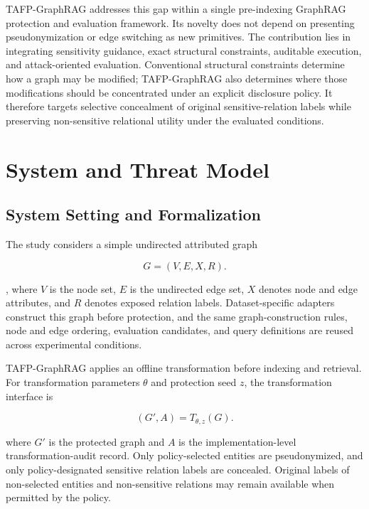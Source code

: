 \documentclass[preprint,12pt]{elsarticle}
\begin{document}
TAFP-GraphRAG addresses this gap within a single pre-indexing GraphRAG protection and evaluation framework. Its novelty does not depend on presenting pseudonymization or edge switching as new primitives. The contribution lies in integrating sensitivity guidance, exact structural constraints, auditable execution, and attack-oriented evaluation. Conventional structural constraints determine how a graph may be modified; TAFP-GraphRAG also determines where those modifications should be concentrated under an explicit disclosure policy. It therefore targets selective concealment of original sensitive-relation labels while preserving non-sensitive relational utility under the evaluated conditions.

\section{System and Threat Model}

\subsection{System Setting and Formalization}

The study considers a simple undirected attributed graph

\begin{equation}G=(V,E,X,R).\end{equation}

, where $V$ is the node set, $E$ is the undirected edge set, $X$ denotes node and edge attributes, and $R$ denotes exposed relation labels. Dataset-specific adapters construct this graph before protection, and the same graph-construction rules, node and edge ordering, evaluation candidates, and query definitions are reused across experimental conditions.

TAFP-GraphRAG applies an offline transformation before indexing and retrieval. For transformation parameters $\theta$ and protection seed $z$, the transformation interface is

\begin{equation}(G',A)=T_{\theta,z}(G).\end{equation}

where $G'$ is the protected graph and $A$ is the implementation-level transformation-audit record. Only policy-selected entities are pseudonymized, and only policy-designated sensitive relation labels are concealed. Original labels of non-selected entities and non-sensitive relations may remain available when permitted by the policy.
\end{document}
